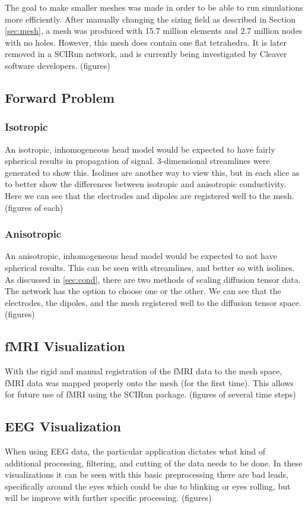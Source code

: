 The goal to make smaller meshes was made in order to be able to run simulations more efficiently. After manually changing the sizing field as described in Section \ref{sec:mesh}, a mesh was produced with 15.7 million elements and 2.7 million nodes with no holes. However, this mesh does contain one flat tetrahedra. It is later removed in a SCIRun network, and is currently being investigated by Cleaver software developers. (figures)

\subsection{Forward Problem}

\subsubsection{Isotropic}

An isotropic, inhomogeneous head model would be expected to have fairly spherical results in propagation of signal. 3-dimensional streamlines were generated to show this. Isolines are another way to view this, but in each slice as to better show the differences between isotropic and anisotropic conductivity. Here we can see that the electrodes and dipoles are registered well to the mesh. (figures of each)

\subsubsection{Anisotropic}

An anisotropic, inhomogeneous head model would be expected to not have spherical results. This can be seen with streamlines, and better so with isolines. As discussed in \ref{sec:cond}, there are two methods of scaling diffusion tensor data. The network has the option to choose one or the other. We can see that the electrodes, the dipoles, and the mesh registered well to the diffusion tensor space. (figures)

\subsection{fMRI Visualization}

With the rigid and manual registration of the fMRI data to the mesh space, fMRI data was mapped properly onto the mesh (for the first time). This allows for future use of fMRI using the SCIRun package. (figures of several time steps)

\subsection{EEG Visualization}

When using EEG data, the particular application dictates what kind of additional processing, filtering, and cutting of the data needs to be done. In these visualizations it can be seen with this basic preprocessing there are bad leads, specifically around the eyes which could be due to blinking or eyes rolling, but will be improve with further specific processing. (figures)